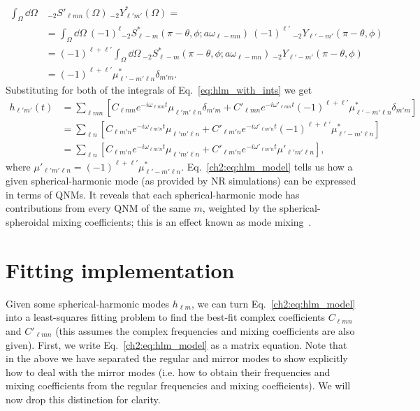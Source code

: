 \begin{align}
    \int_\Omega \dd{\Omega}& ~ {}_{-2}S'_{\ell m n}(\Omega) ~ {}_{-2}Y^*_{\ell' m'}(\Omega) = \nonumber \\ 
    &= \int_\Omega \dd{\Omega} ~ (-1)^\ell {}_{-2}S^*_{\ell -m}(\pi - \theta, \phi; a\omega_{\ell -m n}) ~ (-1)^{\ell'} ~ {}_{-2}Y_{\ell' -m'}(\pi - \theta, \phi) \nonumber \\
    &= (-1)^{\ell+\ell'} \int_\Omega \dd{\Omega} ~ {}_{-2}S^*_{\ell -m}(\pi - \theta, \phi; a\omega_{\ell -m n}) ~ {}_{-2}Y_{\ell' -m'}(\pi - \theta, \phi) \nonumber \\
    &= (-1)^{\ell+\ell'} \mu^*_{\ell' -m' \ell n} \delta_{m' m}.
\end{align}
Substituting for both of the integrals of Eq.~\ref{eq:hlm_with_ints} we get
\begin{align}\label{ch2:eq:hlm_model}
    h_{\ell' m'}(t) &= \sum_{\ell m n} \left[ C_{\ell m n} e^{-i \omega_{\ell m n} t} \mu_{\ell' m' \ell n} \delta_{m' m} + C'_{\ell m n} e^{-i \omega'_{\ell m n} t} (-1)^{\ell+\ell'} \mu^*_{\ell' -m' \ell n} \delta_{m' m} \right] \nonumber \\
    &= \sum_{\ell n} \left[ C_{\ell m' n} e^{-i \omega_{\ell m' n} t} \mu_{\ell' m' \ell n} + C'_{\ell m' n} e^{-i \omega'_{\ell m' n} t} (-1)^{\ell+\ell'} \mu^*_{\ell' -m' \ell n} \right] \nonumber \\
    &= \sum_{\ell n} \left[ C_{\ell m' n} e^{-i \omega_{\ell m' n} t} \mu_{\ell' m' \ell n} + C'_{\ell m' n} e^{-i \omega'_{\ell m' n} t} \mu'_{\ell' m' \ell n} \right],
\end{align}
where $\mu'_{\ell' m' \ell n} = (-1)^{\ell+\ell'} \mu^*_{\ell' -m' \ell n}$.
Eq.~\ref{ch2:eq:hlm_model} tells us how a given spherical-harmonic mode (as provided by NR simulations) can be expressed in terms of QNMs. 
It reveals that each spherical-harmonic mode has contributions from every QNM of the same $m$, weighted by the spherical-spheroidal mixing coefficients; this is an effect known as mode mixing~\cite{Berti:2014fga}.

\section{Fitting implementation}
\label{ch2:sec:fitting}

Given some spherical-harmonic modes $h_{\ell m}$, we can turn Eq.~\ref{ch2:eq:hlm_model} into a least-squares fitting problem to find the best-fit complex coefficients $C_{\ell m n}$ and $C'_{\ell m n}$ (this assumes the complex frequencies and mixing coefficients are also given). 
First, we write Eq.~\ref{ch2:eq:hlm_model} as a matrix equation. 
Note that in the above we have separated the regular and mirror modes to show explicitly how to deal with the mirror modes (i.e. how to obtain their frequencies and mixing coefficients from the regular frequencies and mixing coefficients). 
We will now drop this distinction for clarity.

